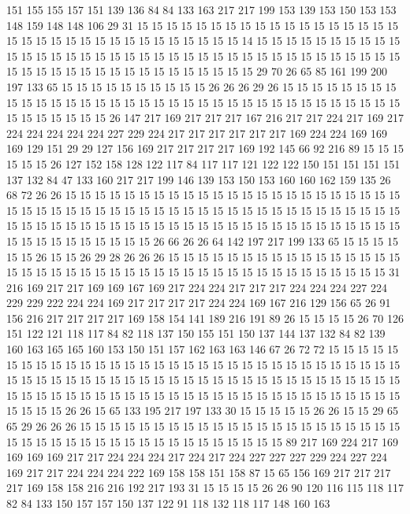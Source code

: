 151 155 155 157 151 139 136 84 84 133 163 217 217 199 153 139 153 150 153 153
148 159 148 148 106 29 31 15 15 15 15 15 15 15 15 15 15 15 15 15
15 15 15 15 15 15 15 15 15 15 15 15 15 15 15 15 15 15 15 15
15 14 15 15 15 15 15 15 15 15 15 15 15 15 15 15 15 15 15 15
15 15 15 15 15 15 15 15 15 15 15 15 15 15 15 15 15 15 15 15
15 15 15 15 15 15 15 15 15 15 15 15 15 15 15 15 29 70 26 65
85 161 199 200 197 133 65 15 15 15 15 15 15 15 15 15 15 26 26 26
29 26 15 15 15 15 15 15 15 15 15 15 15 15 15 15 15 15 15 15
15 15 15 15 15 15 15 15 15 15 15 15 15 15 15 15 15 15 15 15
15 15 15 15 26 147 217 169 217 217 217 167 216 217 217 224 217 169 217 224
224 224 224 224 227 229 224 217 217 217 217 217 217 169 224 224 169 169 169 129
151 29 29 127 156 169 217 217 217 217 169 192 145 66 92 216 89 15 15 15
15 15 15 26 127 152 158 128 122 117 84 117 117 121 122 122 150 151 151 151
151 137 132 84 47 133 160 217 217 199 146 139 153 150 153 160 160 162 159 135
26 68 72 26 26 15 15 15 15 15 15 15 15 15 15 15 15 15 15 15
15 15 15 15 15 15 15 15 15 15 15 15 15 15 15 15 15 15 15 15
15 15 15 15 15 15 15 15 15 15 15 15 15 15 15 15 15 15 15 15
15 15 15 15 15 15 15 15 15 15 15 15 15 15 15 15 15 15 15 15
15 15 15 15 15 15 15 15 15 15 15 15 26 66 26 26 64 142 197 217
199 133 65 15 15 15 15 15 15 26 15 15 26 29 28 26 26 26 15 15
15 15 15 15 15 15 15 15 15 15 15 15 15 15 15 15 15 15 15 15
15 15 15 15 15 15 15 15 15 15 15 15 15 15 15 15 15 15 15 15
31 216 169 217 217 169 169 167 169 217 224 224 217 217 217 224 224 224 227 224
229 229 222 224 224 169 217 217 217 217 224 224 169 167 216 129 156 65 26 91
156 216 217 217 217 217 169 158 154 141 189 216 191 89 26 15 15 15 15 26
70 126 151 122 121 118 117 84 82 118 137 150 155 151 150 137 144 137 132 84
82 139 160 163 165 165 160 153 150 151 157 162 163 163 146 67 26 72 72 15
15 15 15 15 15 15 15 15 15 15 15 15 15 15 15 15 15 15 15 15
15 15 15 15 15 15 15 15 15 15 15 15 15 15 15 15 15 15 15 15
15 15 15 15 15 15 15 15 15 15 15 15 15 15 15 15 15 15 15 15
15 15 15 15 15 15 15 15 15 15 15 15 15 15 15 15 15 15 15 15
15 15 15 15 15 15 15 15 15 26 26 15 65 133 195 217 197 133 30 15
15 15 15 15 26 26 15 15 29 65 65 29 26 26 26 15 15 15 15 15
15 15 15 15 15 15 15 15 15 15 15 15 15 15 15 15 15 15 15 15
15 15 15 15 15 15 15 15 15 15 15 15 15 15 15 15 89 217 169 224
217 169 169 169 169 217 217 224 224 224 217 224 217 224 227 227 227 229 224 227
224 169 217 217 224 224 224 222 169 158 158 151 158 87 15 65 156 169 217 217
217 217 169 158 158 216 216 192 217 193 31 15 15 15 15 26 26 90 120 116
115 118 117 82 84 133 150 157 157 150 137 122 91 118 132 118 117 148 160 163
